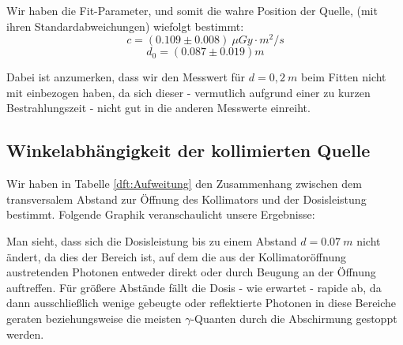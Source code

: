 Wir haben die Fit-Parameter, und somit die wahre Position der Quelle, (mit ihren Standardabweichungen) wiefolgt bestimmt:
\begin{equation*}
		c = (0.109 \pm 0.008)\ \mu Gy \cdot m^2/s
\end{equation*}
\begin{equation*}
		d_0 = (0.087 \pm 0.019) m
\end{equation*}

Dabei ist anzumerken, dass wir den Messwert für $d=0,2\ m$ beim Fitten nicht mit einbezogen haben, da sich dieser - vermutlich aufgrund einer zu kurzen Bestrahlungszeit - nicht gut in die anderen Messwerte einreiht.

\subsection{Winkelabhängigkeit der kollimierten Quelle}
Wir haben in Tabelle \ref{dft:Aufweitung} den Zusammenhang zwischen dem transversalem Abstand zur Öffnung des Kollimators und der Dosisleistung bestimmt. Folgende Graphik veranschaulicht unsere Ergebnisse:

    \minipanf    
		\begin{center}    
        \label{fig:Aufweitung}
        \end{center}
    \minipend
    \vspace{5mm}

Man sieht, dass sich die Dosisleistung bis zu einem Abstand $d=0.07\ m$ nicht ändert, da dies der Bereich ist, auf dem die aus der Kollimatoröffnung austretenden Photonen entweder direkt oder durch Beugung an der Öffnung auftreffen. Für größere Abstände fällt die Dosis - wie erwartet - rapide ab, da dann ausschließlich wenige gebeugte oder reflektierte Photonen in diese Bereiche geraten beziehungsweise die meisten $\gamma$-Quanten durch die Abschirmung gestoppt werden.
